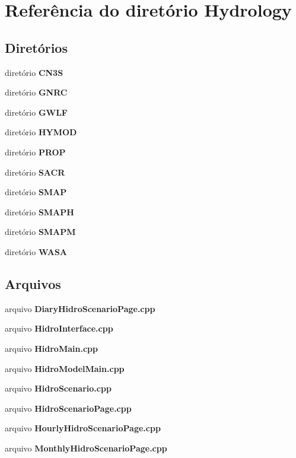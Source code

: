\section{Referência do diretório Hydrology}
\label{dir_648fa1b3a57852e81cc8d58f870ec077}
\subsection*{Diretórios}
\begin{DoxyCompactItemize}
\item 
diretório {\bf C\+N3S}
\item 
diretório {\bf G\+N\+RC}
\item 
diretório {\bf G\+W\+LF}
\item 
diretório {\bf H\+Y\+M\+OD}
\item 
diretório {\bf P\+R\+OP}
\item 
diretório {\bf S\+A\+CR}
\item 
diretório {\bf S\+M\+AP}
\item 
diretório {\bf S\+M\+A\+PH}
\item 
diretório {\bf S\+M\+A\+PM}
\item 
diretório {\bf W\+A\+SA}
\end{DoxyCompactItemize}
\subsection*{Arquivos}
\begin{DoxyCompactItemize}
\item 
arquivo {\bf Diary\+Hidro\+Scenario\+Page.\+cpp}
\item 
arquivo {\bf Hidro\+Interface.\+cpp}
\item 
arquivo {\bf Hidro\+Main.\+cpp}
\item 
arquivo {\bf Hidro\+Model\+Main.\+cpp}
\item 
arquivo {\bf Hidro\+Scenario.\+cpp}
\item 
arquivo {\bf Hidro\+Scenario\+Page.\+cpp}
\item 
arquivo {\bf Hourly\+Hidro\+Scenario\+Page.\+cpp}
\item 
arquivo {\bf Monthly\+Hidro\+Scenario\+Page.\+cpp}
\end{DoxyCompactItemize}
